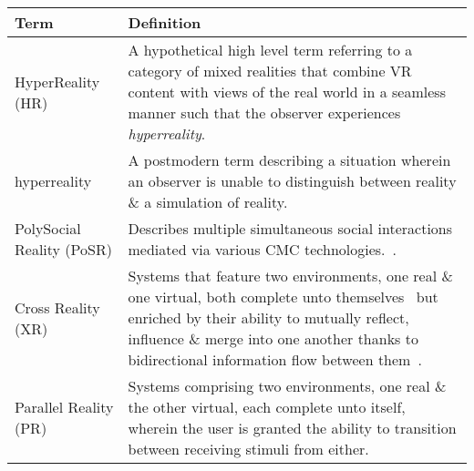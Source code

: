 \begin{center}
\begin{longtable}{| l | p{10cm} |}

\hline

\textbf{Term} & \textbf{Definition} \\

\hline

		
HyperReality (HR) & A hypothetical high level term referring to a category of mixed realities that combine VR content with views of the real world in a seamless manner such that the observer experiences \textit{hyperreality}. \\
		
\hline
		

hyperreality & A postmodern term describing a situation wherein an observer is unable to distinguish between reality \& a simulation of reality. \\

\hline

		
PolySocial Reality (PoSR) & Describes multiple simultaneous social interactions mediated via various CMC technologies.~\cite{Applin2012}. \\

\hline


Cross Reality (XR) & Systems that feature two environments, one real \& one virtual, both complete unto themselves~\cite{lifton:merging} but enriched by their ability to mutually reflect, influence \& merge into one another thanks to bidirectional information flow between them~\cite{kim:practical}. \\

\hline


Parallel Reality (PR) & Systems comprising two environments, one real \& the other virtual, each complete unto itself, wherein the user is granted the ability to transition between receiving stimuli from either. \\

\hline


\end{longtable}
\end{center}


